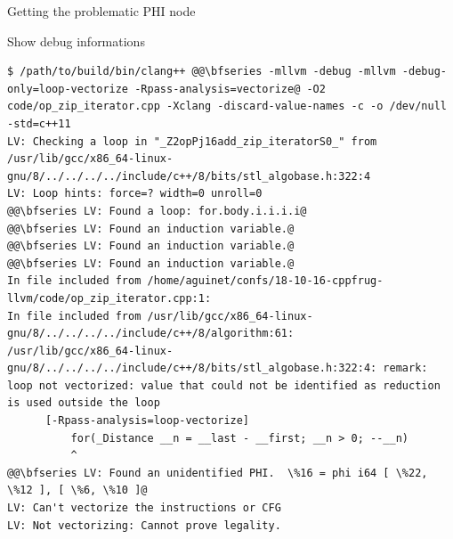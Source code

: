 \begin{frame}[fragile]{Getting the problematic PHI node}
  \begin{block}{Show debug informations}
    \begin{lstlisting}
$ /path/to/build/bin/clang++ @@\bfseries -mllvm -debug -mllvm -debug-only=loop-vectorize -Rpass-analysis=vectorize@ -O2  code/op_zip_iterator.cpp -Xclang -discard-value-names -c -o /dev/null  -std=c++11 
LV: Checking a loop in "_Z2opPj16add_zip_iteratorS0_" from /usr/lib/gcc/x86_64-linux-gnu/8/../../../../include/c++/8/bits/stl_algobase.h:322:4
LV: Loop hints: force=? width=0 unroll=0
@@\bfseries LV: Found a loop: for.body.i.i.i.i@
@@\bfseries LV: Found an induction variable.@
@@\bfseries LV: Found an induction variable.@
@@\bfseries LV: Found an induction variable.@
In file included from /home/aguinet/confs/18-10-16-cppfrug-llvm/code/op_zip_iterator.cpp:1:
In file included from /usr/lib/gcc/x86_64-linux-gnu/8/../../../../include/c++/8/algorithm:61:
/usr/lib/gcc/x86_64-linux-gnu/8/../../../../include/c++/8/bits/stl_algobase.h:322:4: remark: loop not vectorized: value that could not be identified as reduction is used outside the loop
      [-Rpass-analysis=loop-vectorize]
          for(_Distance __n = __last - __first; __n > 0; --__n)
          ^
@@\bfseries LV: Found an unidentified PHI.  \%16 = phi i64 [ \%22, \%12 ], [ \%6, \%10 ]@
LV: Can't vectorize the instructions or CFG
LV: Not vectorizing: Cannot prove legality.
    \end{lstlisting}
  \end{block}
\end{frame}


